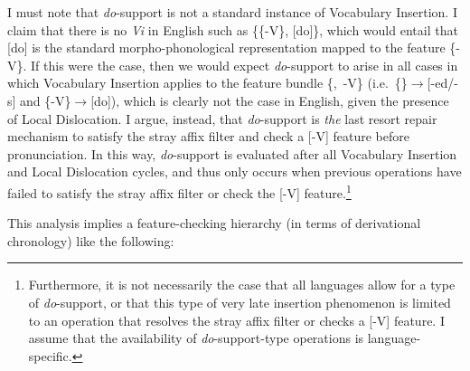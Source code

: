 I must note that {\it do}-support is not a standard instance of Vocabulary Insertion. I claim that there is no {\it Vi} in English such as \{\{-V\}, [do]\}, which would entail that [do] is the standard morpho-phonological representation mapped to the feature \{-V\}. If this were the case, then we would expect {\it do}-support to arise in all cases in which Vocabulary Insertion applies to the feature bundle \{\mbox{},~-V\} (i.e.\ \{\mbox{}\}$\rightarrow$[-ed/-s] and \{-V\}$\rightarrow$[do]), which is clearly not the case in English, given the presence of Local Dislocation. I argue, instead, that {\it do}-support is {\it the} last resort repair mechanism to satisfy the stray affix filter and check a [-V] feature before pronunciation. In this way, {\it do}-support is evaluated after all Vocabulary Insertion and Local Dislocation cycles, and thus only occurs when previous operations have failed to satisfy the stray affix filter or check the [-V] feature.\footnote{Furthermore, it is not necessarily the case that all languages allow for a type of {\it do}-support, or that this type of very late insertion phenomenon is limited to an operation that resolves the stray affix filter or checks a [-V] feature. I assume that the availability of {\it do}-support-type operations is language-specific.}

This analysis implies a feature-checking hierarchy (in terms of derivational chronology) like the following:

